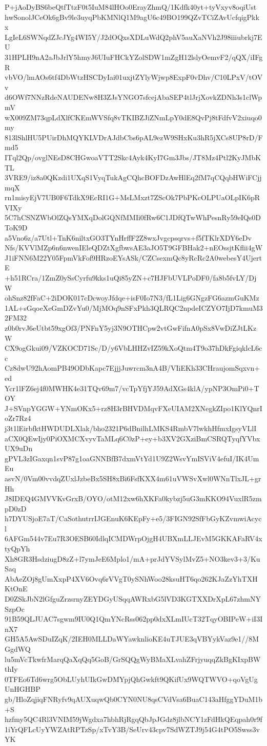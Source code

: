 P+jAoDyBS6beQtfTtzF0t5IuM84lHOo0ErayZhmQ/1Kdfk40yt+tyVxyv8oqiUst
hwSonolJCeOk6gBv9le3uyqPbKMNlQ1M9agU6c49BO199QZvTCiZAvUcfqigPkkx
LgIeL6SWNqdZJcJYg4WI5Y/J2dOQxsXDLuWdQ2phV5auXaNVh2J98iiiubrkj7EU
31HPLH9nA2aJbJrlY5hmyJ6UIuFHCkYZolSDW1mZgH12lslyOemvF2/qQX/iIFgR
vbVO/lmAOs6tf4DbWtzHSCDyIai01uxjtZYlyWjwp8ExpF0vDhv/C10LPxV/tOVv
d6OWf7NNzRdeNAUDENw8H3ZJsYNGO7sfcejAbaSEP4tlJrjXovkZDNh3s1clWpmV
wX009ZM73qpLdXlfCKEmWVSfq8vTKIBZJiZNmLpY0dE8QvPj8tFdfvV2xiuqo0my
813lShlHU5PUirDhMQYKLVDrAJdbCbs6pAL9ezW9SHxKu3hR5jXCs8UP8rD/Fmd5
ITql2Qp/ovglNEsD8CHGwoaVTT2Skc4Ayk4KyI7Gm3Jbs/JT8Mz4Ptl2KyJMbKTL
3VRE9/iz8a0QKzdi1UXqS1VyqTukAgCQhcBOFDzAwHlEq2fM7qCQqbHWiFCjjmqX
rn1misyEjV7UB0F6TdkX9EcRI1G+MsLMxzt7ZScOk7PbPKcOLPUaOLpIK6pRVIXy
5C7hCSNZWbOlZQsYMXqDolGQNfMMIi0fRw6C1JDfQTwWhPesnRy59eIQs0DToK9D
a5Vno6z/a7Utl+TnK6niltxGO3TYnHrffF2Z8wxJvgcpsqrvs+f5fTKlrXDY6eDv
Nfs/KVVlMZp6n6nwenIEleQDZtXgfbwsAE3aJO5T9GFBHak2+nEOssjtKflii4gW
J1iFNN6M22Y05FpmVkFof9HRzoEYsASk/CZCsexmQc8yRcRc2A0webesY4UjertE
+h51RCra/1ZmZ0ySsCyrfu9kks1uQi85yZN+c7HJFbUVLPoDF0/fa8b5fvLY/DjW
ohSnz82fFaC+2iDOK017cDcwoyJfdqe+isF0Io7N3/fL1Lig6GNgzFG6azmGuKMz
1AL+sGqoeXeGmDZvYu0/MjMOq9nSFxPkh3QLRQC2npdeICZYO7IjD7kmuM32FM32
z0b0rvJ6eUtbt59xgOf3/PNFnY5yj3N9OTHCpw2vtGwFifnA0pSx8VwDiZJtLKzW
CX9ogGkui09/VZKOCD71Sc/D/y6VbLHHZvIZ59kXoQtm4T9o37hDkFgiqklcL6cc
Cz8dwU92hAomPB49ODbKapc7EjjjJuwrcm3nA4B/VIiEKh33CHraujomSqxvn+ed
Ycr1lFZ6ej4f0MWHK4e31TQv69m7/vcTpYfjYJ59AdXGs4klA/ypNP3OmPi0+TOY
J+SVnpYGGW+YNmOKx5+rz8H3rBHVDMqvFXeUIAM2XNegkZIpo1KlYQnrIoZr7Rz4
j3t1lEirbfktHWDUDLXlak/bho2321P6dBnilhLMKS4RmbV7lwkhHfmxIgsyVLlI
aCX0QEwIjy0PiOXMCXvyvTaMLq6C0zP+ey+b3XV2GXziBmCSRQTyqfYVbxUX9uDn
gPVL3zIGaxqn1svP87g1oaGNNBfB7dxmVtYd1U9Z2WsvYmISViV4efuI/IK4UmEu
asvN/0Vm00vvdqZUxlJzbeBx5SH8xBi6FsfKXX4m61uVWSvXwl0WNnTlxJL+grHh
J8IDEQ4GMVVKvGrxB/OYO/otM12xw6hXKFa0kybzj5uG3mKKO94VuxlR5zmpD0zD
h7DYUSjoE7aT/CaSothutrrIJGEnuK6KEpFy+e5/3FIGN92SfFbGyKZvmwiAcycl
6AFGm544v7Eu7R3OESB60IdlqICMDWrpOjgH4UBXmLLJEvM5GKKAFaRV4xtyQpYh
Xh8GR3HsdziugD8zZ+l7ymJeE6Mplo1/mA+prJdYVSylMvZ5+NO3kev3+3/KuSaq
AbAeZOj8gUmXxpP4XV6Ovq6rVVgT0ySNhWoo28ksuHT6qo262KJaZzYhTXHKtOnE
D0ZSkJbN2lGfguZrzsrnyZEYDGyUSqqAWRxbG5lVD3KGTXXDrXpL67zhmNYSzpOc
91B59QLJUAC7sgwm9IU0Q1QmYNcRss062pp0dxXLmIUcT32TqyOBIPeW+iI3InX7
GH5A5AwSDuIZqK/2IEH0MLLDaWYawknlioKE4uTJUE3qVBYykVaz9e1//8MGgdWQ
lu5mVcTkwfrMarqQaXqQq5GoB/GrSQQgWyBMaXLvahZFrjyuqqZkBgKIxpBWthIy
0TFEo6Td6wrg5ObLUyhUIkGwDMYpjQhGwkft9QKifUx9WQTWVO+qoVgUgUnHGHBP
gb/HloZqjiqFNRyfv9qAUXuqwQb0CYN0NU8qsCVdVsa6BuaC143aHfggYDuM1b+S
hzfmy5QC4Rl3VNIM59jWgdxa7hbhRjRgqQbJpJGdz8jlbNCY1zFdHkQEqpah0r9f
1iYrQFLcUyYWZAtRPTzSp/xTvY3B/SeUrv43cpv7SdWZTJ9j54G4tPO5Swss3vYK
